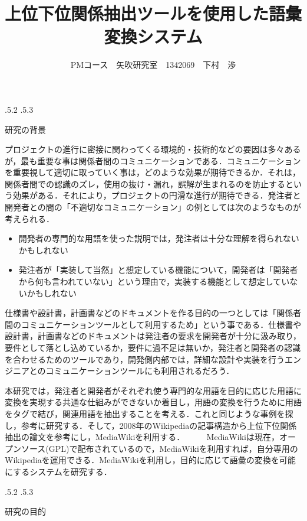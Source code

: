 \documentclass[uplatex]{jsarticle}
\title{\vspace{-14mm}上位下位関係抽出ツールを使用した語彙変換システム}
\author{PMコース　矢吹研究室　1342069　下村　渉}
\date{}%
\makeatletter
\renewcommand{\section}{%
    \if@slide\clearpage\fi
    \@startsection{section}{1}{\z@}%
    {\Cvs \@plus.5\Cdp \@minus.2\Cdp}%
    {.5\Cvs \@plus.3\Cdp}%
    {\normalfont\raggedright}}
\makeatother
\begin{document}
\maketitle





\section{研究の背景}

プロジェクトの進行に密接に関わってくる環境的・技術的などの要因は多々あるが，最も重要な事は関係者間のコミュニケーションである．コミュニケーションを重要視して適切に取っていく事は，どのような効果が期待できるか．それは，関係者間での認識のズレ，使用の抜け・漏れ，誤解が生まれるのを防止するという効果がある．それにより，プロジェクトの円滑な進行が期待できる．発注者と開発者との間の「不適切なコミュニケーション」の例としては次のようなものが考えられる．
\begin{itemize}
  \item 開発者の専門的な用語を使った説明では，発注者は十分な理解を得られないかもしれない
  \item 発注者が「実装して当然」と想定している機能について，開発者は「開発者から何も言われていない」という理由で，実装する機能として想定していないかもしれない
  \end{itemize}

仕様書や設計書，計画書などのドキュメントを作る目的の一つとしては「関係者間のコミュニケーションツールとして利用するため」という事である．仕様書や設計書，計画書などのドキュメントは発注者の要求を開発者が十分に汲み取り，要件として落とし込めているか，要件に過不足は無いか，発注者と開発者の認識を合わせるためのツールであり，開発側内部では，詳細な設計や実装を行うエンジニアとのコミュニケーションツールにも利用されるだろう\cite{a}．

本研究では，発注者と開発者がそれぞれ使う専門的な用語を目的に応じた用語に変換を実現する共通な仕組みができないか着目し，用語の変換を行うために用語をタグで結び，関連用語を抽出することを考える．これと同じような事例を探し，参考に研究する．そして，2008年のWikipediaの記事構造から上位下位関係抽出の論文を参考にし，MediaWikiを利用する．\cite{b}
　
　MediaWikiは現在，オープンソース(GPL)で配布されているので，MediaWikiを利用すれば，自分専用のWikipediaを運用できる\cite{c}．MediaWikiを利用し，目的に応じて語彙の変換を可能にするシステムを研究する．





\section{研究の目的}
\end{document}
